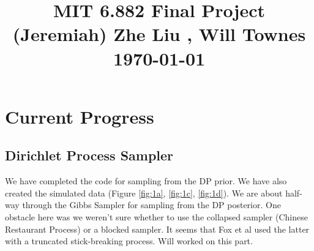 \documentclass[12pt]{article}
\begin{document}
\title{MIT 6.882 Final Project\\ (Jeremiah) Zhe Liu , Will Townes\\ \today \vspace{-1ex}}

\pretitle{\centering\normalsize}
\posttitle{\par}
\author{}
\date{}
\vspace{-10em}
\maketitle
\vspace{-6em}

\tableofcontents



\newpage
\section{\textbf{Current Progress}}
\subsection{\textbf{Dirichlet Process Sampler}}
We have completed the code for sampling from the DP prior. We have also created the simulated data (Figure \ref{fig:1a}, \ref{fig:1c}, \ref{fig:1d}). We are about half-way through the Gibbs Sampler for sampling from the DP posterior. One obstacle here was we weren't sure whether to use the collapsed sampler (Chinese Restaurant Process) or a blocked sampler. It seems that Fox et al \citep{fox_bayesian_2009} used the latter with a truncated stick-breaking process. Will worked on this part.
\end{document}
